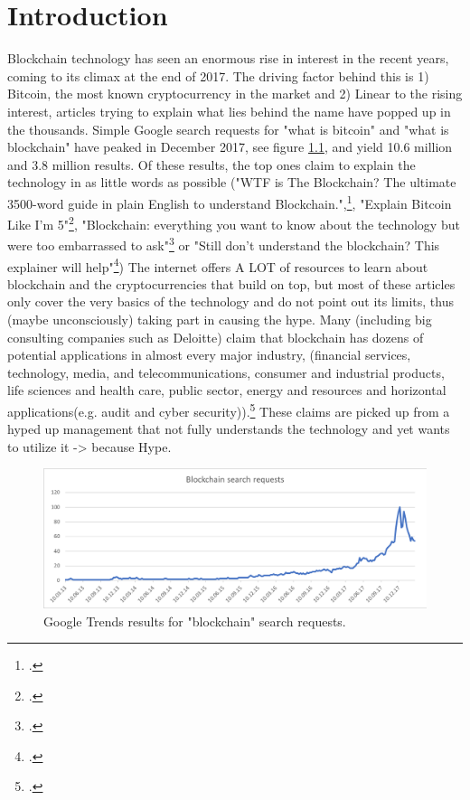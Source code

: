 \chapter{Introduction}
\label{chapter:Intro}

Blockchain technology has seen an enormous rise in interest in the recent years, coming to its climax at the end of 2017. The driving factor behind this is 1) Bitcoin, the most known cryptocurrency in the market and 2) 
Linear to the rising interest, articles trying to explain what lies behind the name have popped up in the thousands. Simple Google search requests for "what is bitcoin" and "what is blockchain" have peaked in December 2017, see figure \ref{fig:SearchRequests}, and yield 10.6 million and 3.8 million results. Of these results, the top ones claim to explain the technology in as little words as possible ("WTF is The Blockchain?
The ultimate 3500-word guide in plain English to understand Blockchain.",\footcite{MamoriaWTFBlockchain2017}, "Explain Bitcoin Like I'm 5"\footcite{CustodioExplainBitcoinFive2013}, "Blockchain: everything you want to know about the technology but were too embarrassed to ask"\footcite{HeathmannBlockchaineverythingyou2018} or "Still don't understand the blockchain? This explainer will help"\footcite{LeighSinodStilldonunderstand2018}) The internet offers A LOT of resources to learn about blockchain and the cryptocurrencies that build on top, but most of these articles only cover the very basics of the technology and do not point out its limits, thus (maybe unconsciously) taking part in causing the hype. Many (including big consulting companies such as Deloitte) claim that blockchain has dozens of potential applications in almost every major industry, (financial services, technology, media, and telecommunications, consumer and industrial products, life sciences and health care, public sector, energy and resources and horizontal applications(e.g. audit and cyber security)).\footcite{SchatskybitcoinBlockchaincoming2015} These claims are picked up from a hyped up management that not fully understands the technology and yet wants to utilize it -> because Hype.

\begin{figure}
    \centering
    \includegraphics[width=\textwidth]{latex-vorlage_v1.5/graphics/BCRQ.png}
    \caption[Google Trends results for "blockchain" search requests.]{Google Trends results for "blockchain" search requests.\footnotemark}
    \label{fig:SearchRequests}
\end{figure}

